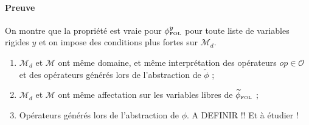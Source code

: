 \documentclass[12pt]{article}
\newcommand{\FOL}{\ensuremath{\textup{\tiny{}FOL}}}
\begin{document}
\paragraph{Preuve} On montre que la propriété est vraie pour $\phi_\FOL^y$ pour toute liste de variables rigides $y$ et on impose des conditions plus fortes sur $\mathcal{M}_d$.
\begin{enumerate}
\item
  $\mathcal{M}_d$ et $\mathcal{M}$ ont même domaine, et même interprétation des opérateurs $op \in \mathcal{O}$ et des opérateurs générés lors de l'abstraction de $\widetilde{\phi}$ ;
\item
  $\mathcal{M}_d$ et $\mathcal{M}$ ont même affectation sur les variables libres de $\widetilde{\phi}_\FOL$ ;
\item
  Opérateurs générés lors de l'abstraction de $\phi$.
  A DEFINIR !! Et à étudier !
\end{enumerate}
\end{document}
